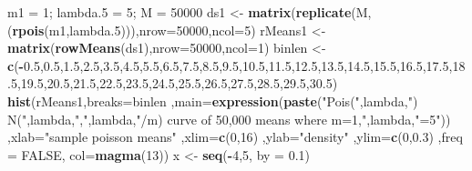 \documentclass[
]{article}
\newenvironment{Shaded}{\begin{snugshade}}{\end{snugshade}}
\newcommand{\DataTypeTok}[1]{\textcolor[rgb]{0.13,0.29,0.53}{#1}}
\newcommand{\DecValTok}[1]{\textcolor[rgb]{0.00,0.00,0.81}{#1}}
\newcommand{\FloatTok}[1]{\textcolor[rgb]{0.00,0.00,0.81}{#1}}
\newcommand{\KeywordTok}[1]{\textcolor[rgb]{0.13,0.29,0.53}{\textbf{#1}}}
\newcommand{\NormalTok}[1]{#1}
\newcommand{\OperatorTok}[1]{\textcolor[rgb]{0.81,0.36,0.00}{\textbf{#1}}}
\newcommand{\OtherTok}[1]{\textcolor[rgb]{0.56,0.35,0.01}{#1}}
\newcommand{\StringTok}[1]{\textcolor[rgb]{0.31,0.60,0.02}{#1}}
\begin{document}
\begin{Shaded}
\begin{Highlighting}[]
\NormalTok{m1 =}\StringTok{ }\DecValTok{1}\NormalTok{; lambda}\FloatTok{.5}\NormalTok{ =}\StringTok{ }\DecValTok{5}\NormalTok{; M =}\StringTok{ }\DecValTok{50000}
\NormalTok{ds1 <-}\StringTok{ }\KeywordTok{matrix}\NormalTok{(}\KeywordTok{replicate}\NormalTok{(M,(}\KeywordTok{rpois}\NormalTok{(m1,lambda}\FloatTok{.5}\NormalTok{))),}\DataTypeTok{nrow=}\DecValTok{50000}\NormalTok{,}\DataTypeTok{ncol=}\DecValTok{5}\NormalTok{)}
\NormalTok{rMeans1 <-}\StringTok{ }\KeywordTok{matrix}\NormalTok{(}\KeywordTok{rowMeans}\NormalTok{(ds1),}\DataTypeTok{nrow=}\DecValTok{50000}\NormalTok{,}\DataTypeTok{ncol=}\DecValTok{1}\NormalTok{)}
\NormalTok{binlen <-}\StringTok{ }\KeywordTok{c}\NormalTok{(}\OperatorTok{-}\FloatTok{0.5}\NormalTok{,}\FloatTok{0.5}\NormalTok{,}\FloatTok{1.5}\NormalTok{,}\FloatTok{2.5}\NormalTok{,}\FloatTok{3.5}\NormalTok{,}\FloatTok{4.5}\NormalTok{,}\FloatTok{5.5}\NormalTok{,}\FloatTok{6.5}\NormalTok{,}\FloatTok{7.5}\NormalTok{,}\FloatTok{8.5}\NormalTok{,}\FloatTok{9.5}\NormalTok{,}\FloatTok{10.5}\NormalTok{,}\FloatTok{11.5}\NormalTok{,}\FloatTok{12.5}\NormalTok{,}\FloatTok{13.5}\NormalTok{,}\FloatTok{14.5}\NormalTok{,}\FloatTok{15.5}\NormalTok{,}\FloatTok{16.5}\NormalTok{,}\FloatTok{17.5}\NormalTok{,}\FloatTok{18.5}\NormalTok{,}\FloatTok{19.5}\NormalTok{,}\FloatTok{20.5}\NormalTok{,}\FloatTok{21.5}\NormalTok{,}\FloatTok{22.5}\NormalTok{,}\FloatTok{23.5}\NormalTok{,}\FloatTok{24.5}\NormalTok{,}\FloatTok{25.5}\NormalTok{,}\FloatTok{26.5}\NormalTok{,}\FloatTok{27.5}\NormalTok{,}\FloatTok{28.5}\NormalTok{,}\FloatTok{29.5}\NormalTok{,}\FloatTok{30.5}\NormalTok{)}
\KeywordTok{hist}\NormalTok{(rMeans1,}\DataTypeTok{breaks=}\NormalTok{binlen ,}\DataTypeTok{main=}\KeywordTok{expression}\NormalTok{(}\KeywordTok{paste}\NormalTok{(}\StringTok{"Pois("}\NormalTok{,lambda,}\StringTok{") ~ N("}\NormalTok{,lambda,}\StringTok{","}\NormalTok{,lambda,}\StringTok{"/m) curve of 50,000 means where m=1,"}\NormalTok{,lambda,}\StringTok{"=5"}\NormalTok{))  ,}\DataTypeTok{xlab=}\StringTok{"sample poisson means"}\NormalTok{ ,}\DataTypeTok{xlim=}\KeywordTok{c}\NormalTok{(}\DecValTok{0}\NormalTok{,}\DecValTok{16}\NormalTok{) ,}\DataTypeTok{ylab=}\StringTok{"density"}\NormalTok{ ,}\DataTypeTok{ylim=}\KeywordTok{c}\NormalTok{(}\DecValTok{0}\NormalTok{,}\FloatTok{0.3}\NormalTok{) ,}\DataTypeTok{freq =} \OtherTok{FALSE}\NormalTok{, }\DataTypeTok{col=}\KeywordTok{magma}\NormalTok{(}\DecValTok{13}\NormalTok{))}
\NormalTok{x <-}\StringTok{ }\KeywordTok{seq}\NormalTok{(}\OperatorTok{-}\DecValTok{4}\NormalTok{,}\DecValTok{5}\NormalTok{, }\DataTypeTok{by =} \FloatTok{0.1}\NormalTok{)}

\end{Highlighting}
\end{Shaded}
\end{document}
